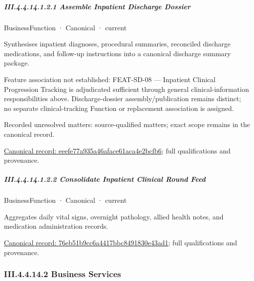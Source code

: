 \subparagraph*{III.4.4.14.1.2.1 Assemble Inpatient Discharge Dossier}
\label{navigation:III.4.4.14.1.2.1}

\label{element:eeefe77a935a46aface61aca4e2bcfb6}
{\small BusinessFunction · Canonical · current}\par

Synthesises inpatient diagnoses, procedural summaries, reconciled discharge medications, and follow-up instructions into a canonical discharge summary package.



Feature association not established: FEAT-SD-08 — Inpatient Clinical Progression Tracking is adjudicated sufficient through general clinical-information responsibilities above. Discharge-dossier assembly/publication remains distinct; no separate clinical-tracking Function or replacement association is assigned.


{\small Recorded unresolved matters: source-qualified matters; exact scope remains in the canonical record.}\par
{\footnotesize \href{../../../../continuum/business/business-function/eeefe77a935a46aface61aca4e2bcfb6.md}{Canonical record: eeefe77a935a46aface61aca4e2bcfb6}; full qualifications and provenance.}\par
\subparagraph*{III.4.4.14.1.2.2 Consolidate Inpatient Clinical Round Feed}
\label{navigation:III.4.4.14.1.2.2}

\label{element:76eb51b9cc6a4417bbc8491830e43ad1}
{\small BusinessFunction · Canonical · current}\par

Aggregates daily vital signs, overnight pathology, allied health notes, and medication administration records.


{\footnotesize \href{../../../../continuum/business/business-function/76eb51b9cc6a4417bbc8491830e43ad1.md}{Canonical record: 76eb51b9cc6a4417bbc8491830e43ad1}; full qualifications and provenance.}\par
\subsubsection*{III.4.4.14.2 Business Services}
\label{navigation:III.4.4.14.2}

